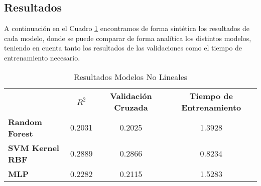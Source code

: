 \subsection{Resultados}

A continuación en el Cuadro \ref{Modelos-No-Lineales-Resultados} encontramos de forma sintética los resultados de cada modelo, donde se puede comparar de forma analítica los distintos modelos, teniendo en cuenta tanto los resultados de las validaciones como el tiempo de entrenamiento necesario.

\begin{table}[h]
    \centering
    \begin{tabular}{lccc}
                                        & \textbf{$R^2$} & \textbf{Validación Cruzada}  & \textbf{Tiempo de Entrenamiento} \\
        \textbf{Random Forest}          &  0.2031   &        0.2025     & 1.3928 \\
        \textbf{SVM Kernel RBF}         &  0.2889   &        0.2866     & 0.8234 \\
        \textbf{MLP}                    &  0.2282	&        0.2115     & 1.5283
    \end{tabular}
    \caption{Resultados Modelos No Lineales}
    \label{Modelos-No-Lineales-Resultados}
\end{table}